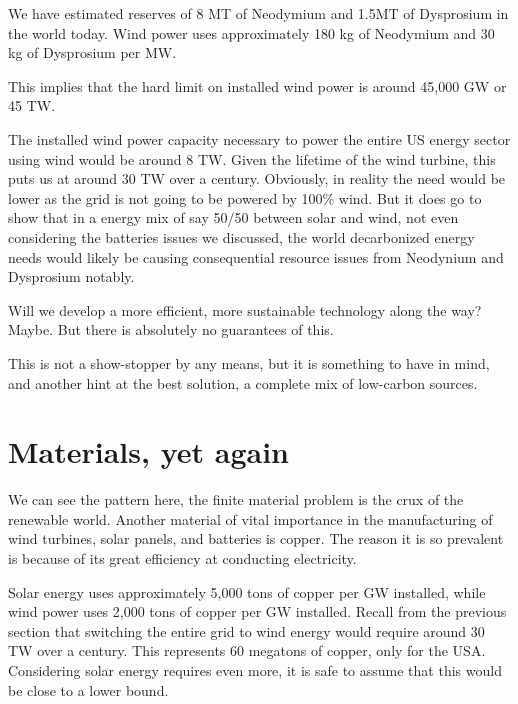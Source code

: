 We have estimated reserves of 8 MT of Neodymium and 1.5MT of Dysprosium in the world today. Wind power uses approximately 180 kg of Neodymium and 30 kg of Dysprosium per MW.

This implies that the hard limit on installed wind power is around 45,000 GW or 45 TW.

The installed wind power capacity necessary to power the entire US energy sector using wind would be around 8 TW. Given the lifetime of the wind turbine, this puts us at around 30 TW over a century. Obviously, in reality the need would be lower as the grid is not going to be powered by 100\% wind. But it does go to show that in a energy mix of say 50/50 between solar and wind, not even considering the batteries issues we discussed, the world decarbonized energy needs would likely be causing consequential resource issues from Neodynium and Dysprosium notably.

Will we develop a more efficient, more sustainable technology along the way? Maybe. But there is absolutely no guarantees of this.

This is not a show-stopper by any means, but it is something to have in mind, and another hint at the best solution, a complete mix of low-carbon sources.

\section{Materials, yet again}

We can see the pattern here, the finite material problem is the crux of the renewable world. Another material of vital importance in the manufacturing of wind turbines, solar panels, and batteries is copper. The reason it is so prevalent is because of its great efficiency at conducting electricity.

Solar energy uses approximately 5,000 tons of copper per GW installed, while wind power uses 2,000 tons of copper per GW installed. Recall from the previous section that switching the entire grid to wind energy would require around 30 TW over a century. This represents 60 megatons of copper, only for the USA. Considering solar energy requires even more, it is safe to assume that this would be close to a lower bound.

